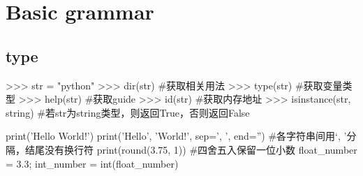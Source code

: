 \section{Basic grammar}

  \subsection{type}
    \begin{codeblock}[language=python, caption={variable type}]
      >>> str = "python"
      >>> dir(str) #获取相关用法
      >>> type(str) #获取变量类型
      >>> help(str) #获取guide
      >>> id(str) #获取内存地址
      >>> isinstance(str, string) #若str为string类型，则返回True，否则返回False
    \end{codeblock}

    \begin{codeblock}[language=python, caption={basic functions}]
      print('Hello World!')
      print('Hello', 'World!', sep=', ', end='') #各字符串间用`, '分隔，结尾没有换行符
      print(round(3.75, 1)) #四舍五入保留一位小数
      float_number = 3.3; int_number = int(float_number)
    \end{codeblock}

